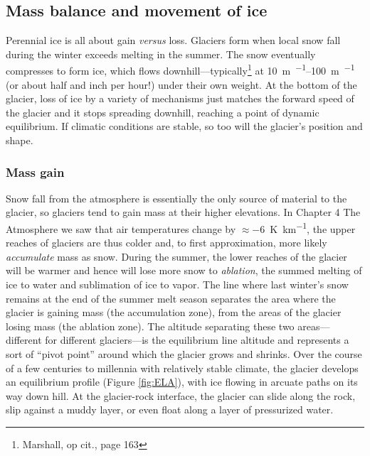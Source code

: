 \subsection{Mass balance and movement of ice}
Perennial ice is all about gain \textit{versus} loss. Glaciers form when local snow fall during the winter exceeds melting in the summer. The snow eventually compresses to form ice, which flows downhill---typically\footnote{Marshall, op cit., page 163} at \SIrange{10}{100}{\metre\per\year} (or about half and inch per hour!) under their own weight. At the bottom of the glacier, loss of ice by a variety of mechanisms just matches the forward speed of the glacier and it stops spreading downhill, reaching a point of dynamic equilibrium. If climatic conditions are stable, so too will the glacier's position and shape.\\

\subsubsection{Mass gain} \label{massgain} Snow fall from the atmosphere is essentially the only source of material to the glacier, so glaciers tend to gain mass at their higher elevations. In Chapter 4 The Atmosphere we saw that air temperatures change by $\approx$\SI{-6}{\kelvin\per\kilo\metre}, the upper reaches of glaciers are thus colder and, to first approximation, more likely \emph{accumulate} mass as snow. During the summer, the lower reaches of the glacier will be warmer and hence will lose more snow to \emph{ablation}, the summed melting of ice to water and sublimation of ice to vapor. The line where last winter's snow remains at the end of the summer melt season separates the area where the glacier is gaining mass (the accumulation zone), from the areas of the glacier losing mass (the ablation zone). The altitude separating these two areas---different for different glaciers---is the equilibrium line altitude and represents a sort of ``pivot point'' around which the glacier grows and shrinks. Over the course of a few centuries to millennia with relatively stable climate, the glacier develops an equilibrium profile (Figure \ref{fig:ELA}), with ice flowing in arcuate paths on its way down hill. At the glacier-rock interface, the glacier can slide along the rock, slip against a muddy layer, or even float along a layer of pressurized water. \\
